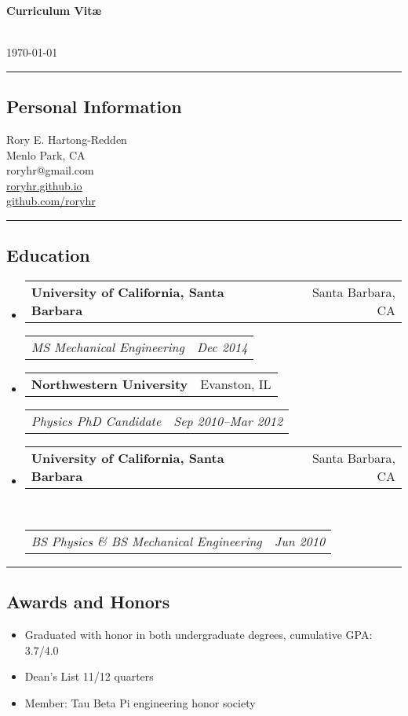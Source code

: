\documentclass[10pt,letterpaper]{article}
\makeatletter
\newenvironment{indentsection}[1]%
{\begin{list}{}%
	{\setlength{\leftmargin}{#1}}%
	\item[]%
}
{\end{list}}
\newcommand{\headerrow}[2]
{\begin{tabular*}{\linewidth}{l@{\extracolsep{\fill}}r}
	#1 &
	#2 \\
\end{tabular*}}
\makeatother
\begin{document}
{\raggedright \LARGE \bf Curriculum Vit\ae}\\
\today
\newline
\hrule
\subsection*{Personal Information}
\begin{indentsection}{\parindent}
Rory E. Hartong-Redden \\
Menlo Park, CA   \\
roryhr@gmail.com \\
\href{roryhr.github.io}{roryhr.github.io} \\
\href{https://github.com/roryhr}{github.com/roryhr}
\end{indentsection}

\hrule
\subsection*{Education}
\begin{itemize}
	\parskip=-0.1em
	\item 
	\headerrow
		{\textbf{University of California, Santa Barbara}}
		{Santa Barbara, CA}
	\headerrow
		{\emph{MS  Mechanical Engineering}}
		{\emph{Dec 2014}}
	\item 
	\headerrow
		{\textbf{Northwestern University}}{Evanston, IL}
	\headerrow
		{\emph{Physics PhD Candidate}}{\emph{Sep 2010--Mar 2012}}
	\item 
	\headerrow
		{\textbf{University of California, Santa Barbara}}
		{Santa Barbara, CA}	\\
	\headerrow
		{\emph{BS Physics \&  BS Mechanical Engineering}}
		{\emph{Jun 2010}}
\end{itemize}

\hrule
\subsection*{Awards and Honors}
\begin{indentsection}{\parindent}
	\begin{itemize}
		\parskip=-0.1em
		\item Graduated with honor in both undergraduate degrees, cumulative GPA: 3.7/4.0
		\item Dean's List 11/12 quarters
		\item Member: Tau Beta Pi engineering honor society
	\end{itemize}
\end{indentsection}
\end{document}
